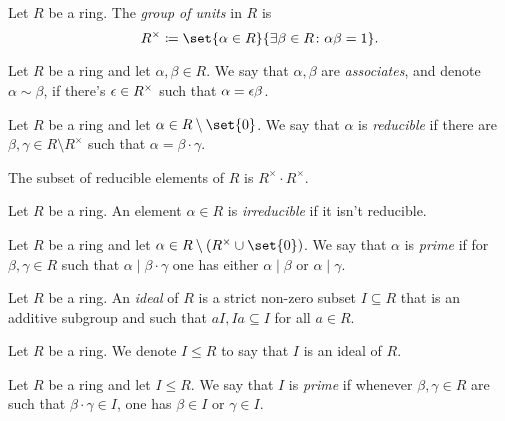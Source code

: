 \documentclass[11pt]{karticle}
\begin{document}
\begin{definition}
Let $R$ be a ring. The \emph{group of units} in $R$ is
\[R^\times \coloneqq \set{\alpha \in R}{\exists \beta \in R \colon \alpha \beta = 1} \text{.}\]
\end{definition}

\begin{definition}
Let $R$ be a ring and let $\alpha,\beta \in R$. We say that $\alpha, \beta$ are \emph{associates}, and denote $\alpha \sim \beta$, if there's $\eps \in R^\times$ such that $\alpha = \eps \beta$.
\end{definition}

\begin{definition}
Let $R$ be a ring and let $\alpha \in R \setminus \set{0}$. We say that $\alpha$ is \emph{reducible} if there are $\beta,\gamma \in R \setminus R^\times$ such that $\alpha = \beta \cdot \gamma$.
\end{definition}

\begin{remark}
The subset of reducible elements of $R$ is $R^\times \cdot R^\times$.
\end{remark}

\begin{definition}
Let $R$ be a ring. An element $\alpha \in R$ is \emph{irreducible} if it isn't reducible.
\end{definition}

\begin{definition}
Let $R$ be a ring and let $\alpha \in R \setminus \prs{R^\times \cup \set{0}}$. We say that $\alpha$ is \emph{prime} if for $\beta,\gamma \in R$ such that $\alpha \mid \beta \cdot \gamma$ one has either $\alpha \mid \beta$ or $\alpha \mid \gamma$.
\end{definition}

\begin{definition}
Let $R$ be a ring. An \emph{ideal} of $R$ is a strict non-zero subset $I \subseteq R$ that is an additive subgroup and such that $aI, Ia \subseteq I$ for all $a \in R$.
\end{definition}

\begin{notation}
Let $R$ be a ring. We denote $I \leq R$ to say that $I$ is an ideal of $R$.
\end{notation}

\begin{definition}
Let $R$ be a ring and let $I \leq R$. We say that $I$ is \emph{prime} if whenever $\beta,\gamma \in R$ are such that $\beta \cdot \gamma \in I$, one has $\beta \in I$ or $\gamma \in I$.
\end{definition}
\end{document}
